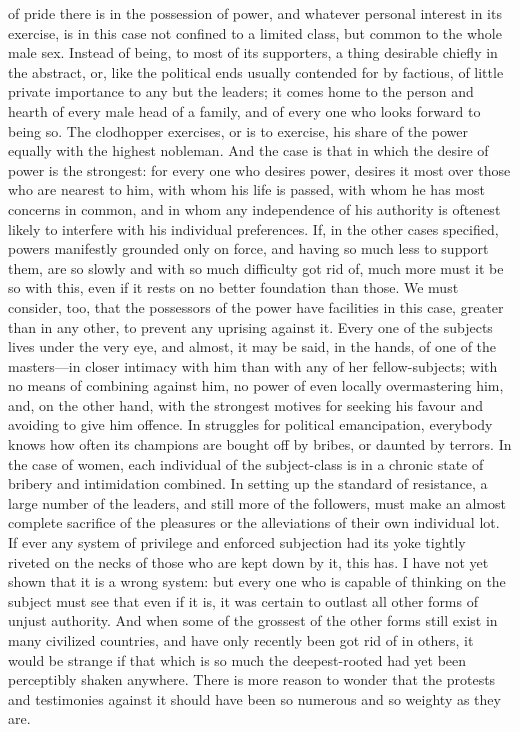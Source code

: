 \documentclass[12pt]{report}
\begin{document}
of pride there is in the possession of power, and whatever personal interest in its exercise, is in this case not confined to a limited class, but common to the whole male sex. Instead of being, to most of its supporters, a thing desirable chiefly in the abstract, or, like the political ends usually contended for by factious, of little private importance to any but the leaders; it comes home to the person and hearth of every male head of a family, and of every one who looks forward to being so. The clodhopper exercises, or is to exercise, his share of the power equally with the highest nobleman. And the case is that in which the desire of power is the strongest: for every one who desires power, desires it most over those who are nearest to him, with whom his life is passed, with whom he has most concerns in common, and in whom any independence of his authority is oftenest likely to interfere with his individual preferences. If, in the other cases specified, powers manifestly grounded only on force, and having so much less to support them, are so slowly and with so much difficulty got rid of, much more must it be so with this, even if it rests on no better foundation than those. We must consider, too, that the possessors of the power have facilities in this case, greater than in any other, to prevent any uprising against it. Every one of the subjects lives under the very eye, and almost, it may be said, in the hands, of one of the masters—in closer intimacy with him than with any of her fellow-subjects; with no means of combining against him, no power of even locally overmastering him, and, on the other hand, with the strongest motives for seeking his favour and avoiding to give him offence. In struggles for political emancipation, everybody knows how often its champions are bought off by bribes, or daunted by terrors. In the case of women, each individual of the subject-class is in a chronic state of bribery and intimidation combined. In setting up the standard of resistance, a large number of the leaders, and still more of the followers, must make an almost complete sacrifice of the pleasures or the alleviations of their own individual lot. If ever any system of privilege and enforced subjection had its yoke tightly riveted on the necks of those who are kept down by it, this has. I have not yet shown that it is a wrong system: but every one who is capable of thinking on the subject must see that even if it is, it was certain to outlast all other forms of unjust authority. And when some of the grossest of the other forms still exist in many civilized countries, and have only recently been got rid of in others, it would be strange if that which is so much the deepest-rooted had yet been perceptibly shaken anywhere. There is more reason to wonder that the protests and testimonies against it should have been so numerous and so weighty as they are.
\end{document}
